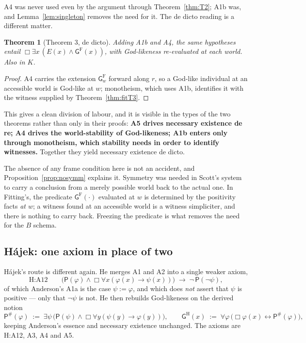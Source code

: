 \documentclass[11pt]{article}
\theoremstyle{plain}
\newtheorem{theorem}{Theorem}
\theoremstyle{definition}
\newcommand{\Gd}{\mathsf{G}}
\newcommand{\Pos}{\mathsf{P}}
\begin{document}
\noindent
A4 was never used even by the argument through
Theorem~\ref{thm:T2}; A1b was, and Lemma~\ref{lem:singleton} removes the need
for it. The de dicto reading is a different matter.

\begin{theorem}[Theorem 3, de dicto]\label{thm:fitdd}
Adding A1b and A4, the same hypotheses entail
$\Box\exists x\,(E(x) \wedge \Gd^{\mathrm{F}}(x))$, with God-likeness
re-evaluated at each world. Also in $K$.
\end{theorem}

\begin{proof}
A4 carries the extension $\Gd^{\mathrm{F}}_w$ forward along $r$, so a God-like
individual at an accessible world is God-like at $w$; monotheism, which uses
A1b, identifies it with the witness supplied by Theorem~\ref{thm:fitT3}.
\end{proof}

\noindent
This gives a clean division of labour, and it is visible in the types of the
two theorems rather than only in their proofs: \textbf{A5 drives necessary
existence de re; A4 drives the world-stability of God-likeness; A1b enters only
through monotheism, which stability needs in order to identify witnesses.}
Together they yield necessary existence de dicto.

\noindent
The absence of any frame condition here is not an accident, and
Proposition~\ref{prop:nosymm} explains it. Symmetry was needed in Scott's
system to carry a conclusion from a merely possible world back to the actual
one. In Fitting's, the predicate $\Gd^{\mathrm{F}}(\cdot)$ evaluated at $w$ is
determined by the positivity facts \emph{at $w$}; a witness found at an
accessible world is a witness simpliciter, and there is nothing to carry back.
Freezing the predicate is what removes the need for the $B$ schema.

\subsection{H\'ajek: one axiom in place of two}\label{sec:hajek}

H\'ajek's route is different again. He merges A1 and A2 into a single weaker
axiom,
\[
  \text{H:A12}\qquad
  \bigl(\Pos(\varphi) \wedge \Box\forall x(\varphi(x) \to \psi(x))\bigr)
  \;\to\; \neg\,\Pos(\neg\psi),
\]
of which Anderson's A1a is the case $\psi := \varphi$, and which does
\emph{not} assert that $\psi$ is positive --- only that $\neg\psi$ is not. He
then rebuilds God-likeness on the derived notion
\[
  \Pos^{\#}(\varphi) \;:=\; \exists\psi\,\bigl(\Pos(\psi) \wedge \Box\forall y(\psi(y) \to \varphi(y))\bigr),
  \qquad
  \Gd^{\mathrm{H}}(x) \;:=\; \forall\varphi\,\bigl(\Box\varphi(x) \leftrightarrow \Pos^{\#}(\varphi)\bigr),
\]
keeping Anderson's essence and necessary existence unchanged. The axioms are
H:A12, A3, A4 and A5.
\end{document}
